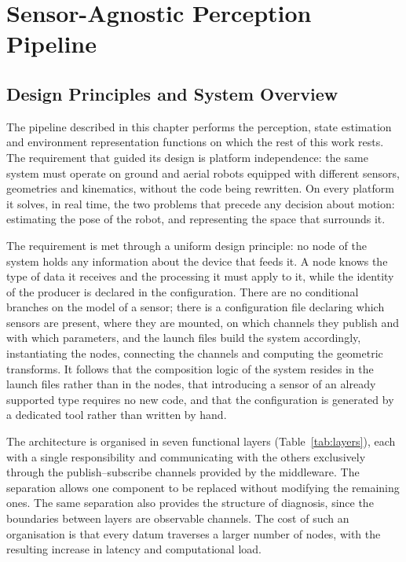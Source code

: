 \chapter{Sensor-Agnostic Perception Pipeline}
\label{ch:pipeline}

\section{Design Principles and System Overview}
\label{sec:pipeline-overview}

The pipeline described in this chapter performs the perception, state
estimation and environment representation functions on which the rest of this
work rests. The requirement that guided its design is platform independence:
the same system must operate on ground and aerial robots equipped with
different sensors, geometries and kinematics, without the code being rewritten.
On every platform it solves, in real time, the two problems that precede any
decision about motion: estimating the pose of the robot, and representing the
space that surrounds it.

The requirement is met through a uniform design principle: no node of the
system holds any information about the device that feeds it. A node knows the
type of data it receives and the processing it must apply to it, while the
identity of the producer is declared in the configuration. There are no
conditional branches on the model of a sensor; there is a configuration file
declaring which sensors are present, where they are mounted, on which channels
they publish and with which parameters, and the launch files build the system
accordingly, instantiating the nodes, connecting the channels and computing the
geometric transforms. It follows that the composition logic of the system
resides in the launch files rather than in the nodes, that introducing a sensor
of an already supported type requires no new code, and that the configuration is
generated by a dedicated tool rather than written by hand.

The architecture is organised in seven functional layers
(Table~\ref{tab:layers}), each with a single responsibility and communicating
with the others exclusively through the publish--subscribe channels provided by
the middleware. The separation allows one component to be replaced without
modifying the remaining ones. The same separation also provides the structure of
diagnosis, since the boundaries between layers are observable channels. The cost
of such an organisation is that every datum traverses a larger number of nodes,
with the resulting increase in latency and computational load.

